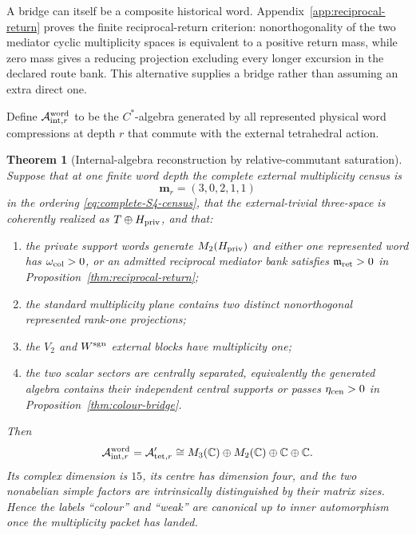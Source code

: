 \documentclass[11pt]{article}
\numberwithin{equation}{section}
\newtheorem{theorem}{Theorem}[section]
\theoremstyle{definition}
\theoremstyle{remark}
\newcommand{\C}{\mathbb C}
\newcommand{\A}{\mathcal A}
\begin{document}
A bridge can itself be a composite historical word.
Appendix~\ref{app:reciprocal-return} proves the finite reciprocal-return
criterion: nonorthogonality of the two mediator cyclic multiplicity spaces
is equivalent to a positive return mass, while zero mass gives a reducing
projection excluding every longer excursion in the declared route bank.
This alternative supplies a bridge rather than assuming an extra direct one.

Define $\A_{{\rm int},r}^{\rm word}$ to be the $C^*$-algebra generated by
all represented physical word compressions at depth $r$ that commute with the
external tetrahedral action.

\begin{theorem}[Internal-algebra reconstruction by relative-commutant saturation]
\label{thm:internal-seed-saturation}
Suppose that at one finite word depth the complete external multiplicity
census is
\begin{equation}
\bm m_r=(3,0,2,1,1)
\label{eq:SM-multiplicity-census}
\end{equation}
in the ordering \eqref{eq:complete-S4-census},
that the external-trivial three-space is coherently realized as
$T\oplus H_{\rm priv}$, and that:
\begin{enumerate}[label=\textup{(I\arabic*)},leftmargin=3em]
\item the private support words generate $M_2(H_{\rm priv})$ and either one
      represented word has $\omega_{\rm col}>0$, or an admitted reciprocal
      mediator bank satisfies $\mathfrak m_{\rm ret}>0$ in
      Proposition~\ref{thm:reciprocal-return};
\item the standard multiplicity plane contains two distinct nonorthogonal
      represented rank-one projections;
\item the $V_2$ and $W^{\rm sgn}$ external blocks have multiplicity one;
\item the two scalar sectors are centrally separated, equivalently the
      generated algebra contains their independent central supports or passes
      $\eta_{\rm cen}>0$ in Proposition~\ref{thm:colour-bridge}.
\end{enumerate}
Then
\begin{equation}
\A_{{\rm int},r}^{\rm word}
=
\A_{{\rm tet},r}'
\cong
M_3(\C)\oplus M_2(\C)\oplus\C\oplus\C.
\label{eq:active-internal-algebra}
\end{equation}
Its complex dimension is $15$, its centre has dimension four, and the two
nonabelian simple factors are intrinsically distinguished by their matrix
sizes.  Hence the labels ``colour'' and ``weak'' are canonical up to inner
automorphism once the multiplicity packet has landed.
\end{theorem}
\end{document}
